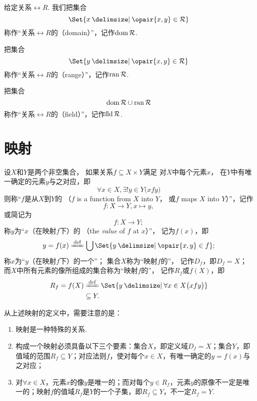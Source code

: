 \begin{definition}
给定关系\(\rel{R}\).
我们把集合\[
	\Set{ x \given \opair{x,y} \in \rel{R} }
\]称作“关系\(\rel{R}\)的（domain）”，记作\(\operatorname{dom} \mathcal{R}\).

把集合\[
	\Set{ y \given \opair{x,y} \in \rel{R} }
\]称作“关系\(\rel{R}\)的（range）”，记作\(\operatorname{ran} \mathcal{R}\).

把集合\[
	\operatorname{dom} \mathcal{R} \cup \operatorname{ran} \mathcal{R}
\]称作“关系\(\rel{R}\)的（field）”，记作\(\operatorname{fld} \mathcal{R}\).
\end{definition}

\section{映射}
\begin{definition}
设\(X\)和\(Y\)是两个非空集合，%
如果关系\(f \subseteq X \times Y\)满足%
对\(X\)中每个元素\(x\)，%
在\(Y\)中有唯一确定的元素\(y\)与之对应，即\[
\forall x \in X,
\exists! y \in Y
\bigl( x f y \bigr)
\]则称“\(f\)是从\(X\)到\(Y\)的%
（\(f\) is a function from \(X\) into \(Y\)，%
或\(f\) maps \(X\) into \(Y\)）”，记作\[
f\colon X \to Y, x \mapsto y,
\]或简记为\[
f\colon X \to Y;
\]
称\(y\)为“\(x\)（在映射\(f\)下）的%
（the \emph{value} of \(f\) at \(x\)）”，%
记为\(f(x)\)，即\[
y = f(x)
\defeq \bigcup\Set{ y \given \opair{x,y} \in f };
\]
称\(x\)为“\(y\)（在映射\(f\)下）的一个”；
集合\(X\)称为“映射\(f\)的”，%
记作\(D_f\)，即\(D_f = X\)；
而\(X\)中所有元素的像所组成的集合称为“映射\(f\)的”，%
记作\(R_f\)或\(f(X)\)，即\[\begin{aligned}
R_f = f(X)
&\defeq \Set{ y \given \forall x \in X \bigl( x f y \bigr) } \\
&\subseteq Y.
\end{aligned}\]
\end{definition}

从上述映射的定义中，需要注意的是：
\begin{enumerate}
\item 映射是一种特殊的关系.
\item 构成一个映射必须具备以下三个要素：集合\(X\)，即定义域\(D_f = X\)；集合\(Y\)，即值域的范围\(R_f \subseteq Y\)；对应法则\(f\)，使对每个\(x \in X\)，有唯一确定的\(y=f(x)\)与之对应；
\item 对\(\forall x \in X\)，元素\(x\)的像\(y\)是唯一的；而对每个\(y \in R_f\)，元素\(y\)的原像不一定是唯一的；映射\(f\)的值域\(R_f\)是\(Y\)的一个子集，即\(R_f \subseteq Y\)，不一定\(R_f = Y\).
\end{enumerate}

